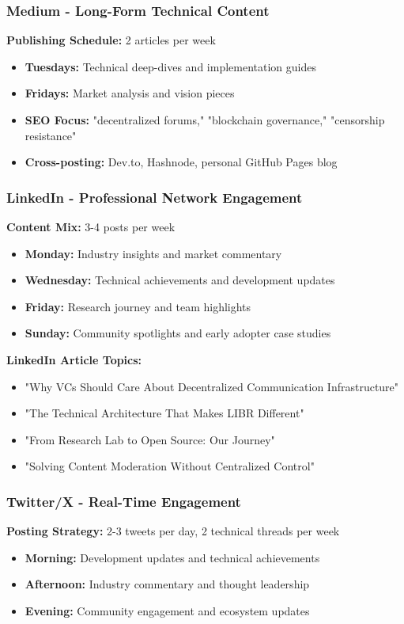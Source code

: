 \documentclass[12pt,a4paper]{article}
\begin{document}
\subsubsection{Medium - Long-Form Technical Content}
\textbf{Publishing Schedule:} 2 articles per week
\begin{itemize}
    \item \textbf{Tuesdays:} Technical deep-dives and implementation guides
    \item \textbf{Fridays:} Market analysis and vision pieces
    \item \textbf{SEO Focus:} "decentralized forums," "blockchain governance," "censorship resistance"
    \item \textbf{Cross-posting:} Dev.to, Hashnode, personal GitHub Pages blog
\end{itemize}

\subsubsection{LinkedIn - Professional Network Engagement}
\textbf{Content Mix:} 3-4 posts per week
\begin{itemize}
    \item \textbf{Monday:} Industry insights and market commentary
    \item \textbf{Wednesday:} Technical achievements and development updates
    \item \textbf{Friday:} Research journey and team highlights
    \item \textbf{Sunday:} Community spotlights and early adopter case studies
\end{itemize}

\textbf{LinkedIn Article Topics:}
\begin{itemize}
    \item "Why VCs Should Care About Decentralized Communication Infrastructure"
    \item "The Technical Architecture That Makes LIBR Different"
    \item "From Research Lab to Open Source: Our Journey"
    \item "Solving Content Moderation Without Centralized Control"
\end{itemize}

\subsubsection{Twitter/X - Real-Time Engagement}
\textbf{Posting Strategy:} 2-3 tweets per day, 2 technical threads per week
\begin{itemize}
    \item \textbf{Morning:} Development updates and technical achievements
    \item \textbf{Afternoon:} Industry commentary and thought leadership
    \item \textbf{Evening:} Community engagement and ecosystem updates
\end{itemize}
\end{document}
